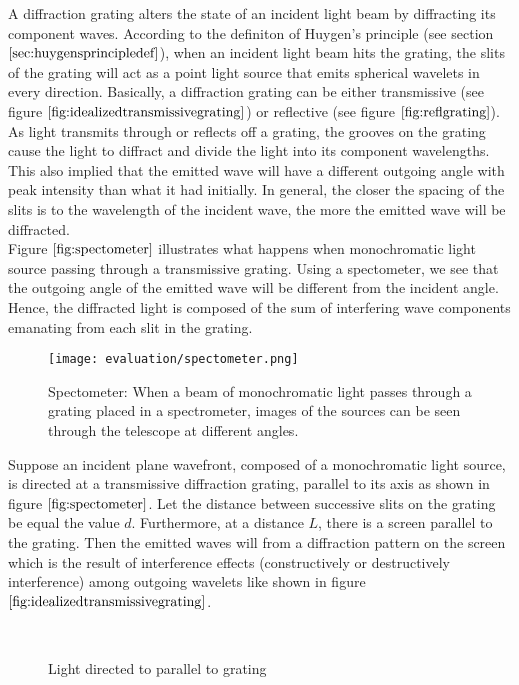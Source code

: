 A diffraction grating alters the state of an incident light beam by diffracting its component waves. According to the definiton of Huygen's principle (see section $\ref{sec:huygensprincipledef}$), when an incident light beam hits the grating, the slits of the grating will act as a point light source that emits spherical wavelets in every direction. Basically, a diffraction grating can be either transmissive (see figure $\ref{fig:idealizedtransmissivegrating}$) or reflective (see figure $\ref{fig:reflgrating}$). As light transmits through or reflects off a grating, the grooves on the grating cause the light to diffract and divide the light into its component wavelengths. This also implied that the emitted wave will have a different outgoing angle with peak intensity than what it had initially. In general, the closer the spacing of the slits is to the wavelength of the incident wave, the more the emitted wave will be diffracted. \\

Figure $\ref{fig:spectometer}$ illustrates what happens when monochromatic light source passing through a transmissive grating. Using a spectometer, we see that the outgoing angle of the emitted wave will be different from the incident angle. Hence, the diffracted light is composed of the sum of interfering wave components emanating from each slit in the grating.

\begin{figure}[H]
  \centering
  \texttt{[image: evaluation/spectometer.png]}
  \caption[Spectometer]{Spectometer: When a beam of monochromatic light passes through a grating placed in a spectrometer, images of the sources can be seen through the telescope at different angles.}
\label{fig:spectometer}
\end{figure}

Suppose an incident plane wavefront, composed of a monochromatic light source, is directed at a transmissive diffraction grating, parallel to its axis as shown in figure $\ref{fig:spectometer}$. Let the distance between successive slits on the grating be equal the value $d$. Furthermore, at a distance $L$, there is a screen parallel to the grating. Then the emitted waves will from a diffraction pattern on the screen which is the result of interference effects (constructively or destructively interference) among outgoing wavelets like shown in figure $\ref{fig:idealizedtransmissivegrating}$. 

\begin{figure}[H]
  \centering
~  

\caption[Idealized Diffraction Grating]{Light directed to parallel to grating}
\label{fig:lighthitsgrating}
\end{figure}

